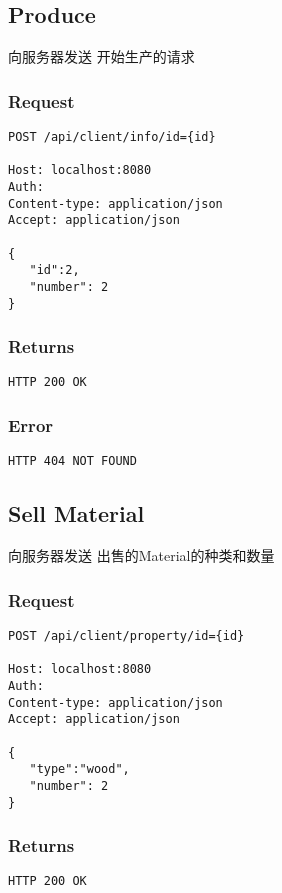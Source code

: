 \documentclass{article}
\begin{document}
\subsection{Produce}
向服务器发送 开始生产的请求
\subsubsection*{Request}
\begin{lstlisting}
POST /api/client/info/id={id}

Host: localhost:8080
Auth:
Content-type: application/json
Accept: application/json

{
   "id":2,
   "number": 2
}
\end{lstlisting}
\subsubsection*{Returns}
\begin{lstlisting}
HTTP 200 OK
\end{lstlisting}
\subsubsection*{Error}
\begin{lstlisting}
HTTP 404 NOT FOUND
\end{lstlisting}





\subsection{Sell Material}
向服务器发送 出售的Material的种类和数量
\subsubsection*{Request}
\begin{lstlisting}
POST /api/client/property/id={id}

Host: localhost:8080
Auth:
Content-type: application/json
Accept: application/json

{
   "type":"wood",
   "number": 2
}
\end{lstlisting}
\subsubsection*{Returns}
\begin{lstlisting}
HTTP 200 OK
\end{lstlisting}
\end{document}
